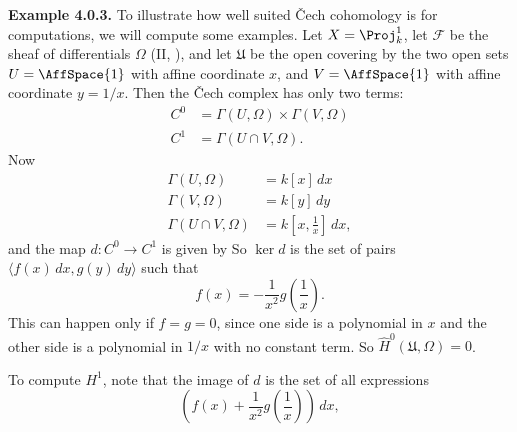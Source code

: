 {\medskip
\noindent\hypertarget{result-III-4.0.3}{}\textbf{Example 4.0.3.} To illustrate how well suited \v{C}ech cohomology is for computations, we will compute some examples. Let $X=\Proj_k^1$, let $\mathcal F$ be the sheaf of differentials $\Omega$ (II, ), and let $\mathfrak U$ be the open covering by the two open sets $U=\AffSpace{1}$ with affine coordinate $x$, and $V=\AffSpace{1}$ with affine coordinate $y=1/x$. Then the \v{C}ech complex has only two terms:
\[
\begin{aligned}
C^0&=\Gamma(U,\Omega)\times\Gamma(V,\Omega)\\
C^1&=\Gamma(U\cap V,\Omega).
\end{aligned}
\]
Now
\[
\begin{aligned}
\Gamma(U,\Omega)&=k[x]\,dx\\
\Gamma(V,\Omega)&=k[y]\,dy\\
\Gamma(U\cap V,\Omega)&=k\left[x,\frac1x\right]\,dx,
\end{aligned}
\]
and the map $d\colon C^0\to C^1$ is given by
So $\ker d$ is the set of pairs $\langle f(x)\,dx,g(y)\,dy\rangle$ such that
\[
f(x)=-\frac1{x^2}g\left(\frac1x\right).
\]
This can happen only if $f=g=0$, since one side is a polynomial in $x$ and the other side is a polynomial in $1/x$ with no constant term. So $\widehat H^0(\mathfrak U,\Omega)=0$.

To compute $H^1$, note that the image of $d$ is the set of all expressions
\[
\left(f(x)+\frac1{x^2}g\left(\frac1x\right)\right)\,dx,
\]
}
